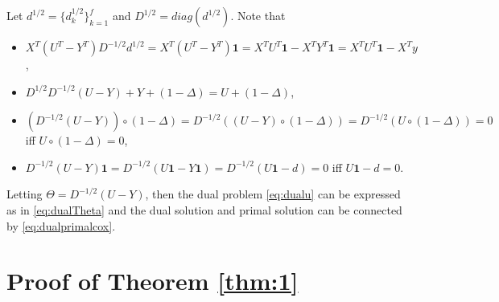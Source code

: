 Let $d^{1/2}=\{d_k^{1/2}\}_{k=1}^f$ and $D^{1/2}=diag(d^{1/2})$. Note that \begin{itemize}
    \item $X^T(U^T-Y^T)D^{-1/2}d^{1/2}=X^T(U^T-Y^T)\mathbf{1}=X^TU^T\mathbf{1}-X^TY^T\mathbf{1}=X^TU^T\mathbf{1}-X^Ty$,
    \item $D^{1/2}D^{-1/2}(U-Y)+Y+(1-\Delta)=U+(1-\Delta)$,
    \item $\left(D^{-1/2}(U-Y)\right)\circ(1-\Delta)=D^{-1/2}\left((U-Y)\circ(1-\Delta)\right)=D^{-1/2}\left(U\circ(1-\Delta)\right)=0$ iff $U\circ(1-\Delta)=0$,
    \item $D^{-1/2}(U-Y)\mathbf{1}=D^{-1/2}(U\mathbf{1}-Y\mathbf{1})=D^{-1/2}(U\mathbf{1}-d)=0$ iff $U\mathbf{1}-d=0$.
\end{itemize}
Letting $\Theta=D^{-1/2}(U-Y)$, then the dual problem \eqref{eq:dualu} can be expressed as in \eqref{eq:dualTheta} and the dual solution and primal solution can be connected by \eqref{eq:dualprimalcox}.


\section{Proof of Theorem \ref{thm:1}}


